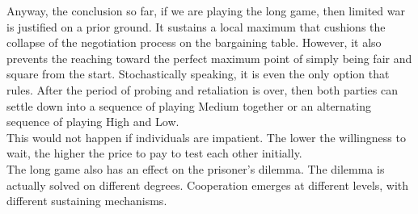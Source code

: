 \documentclass[12.5pt]{report}
\begin{document}
Anyway, the conclusion so far, if we are playing the long game, then limited war is justified on a prior ground. It sustains a local maximum that cushions the collapse of the negotiation process on the bargaining table. However, it also prevents the reaching toward the perfect maximum point of simply being fair and square from the start. Stochastically speaking, it is even the only option that rules. After the period of probing and retaliation is over, then both parties can settle down into a sequence of playing Medium together or an alternating sequence of playing High and Low.\\

This would not happen if individuals are impatient. The lower the willingness to wait, the higher the price to pay to test each other initially.\\

The long game also has an effect on the prisoner's dilemma. The dilemma is actually solved on different degrees. Cooperation emerges at different levels, with different sustaining mechanisms.\\
\end{document}
